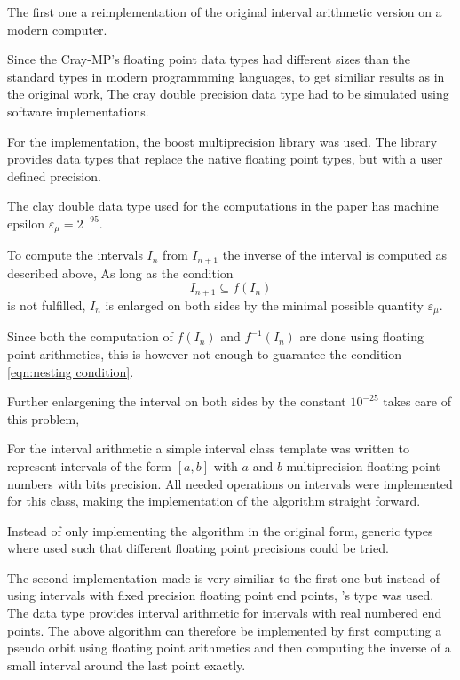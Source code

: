   The first one a reimplementation of the original interval arithmetic version
  on a modern computer.
  
  Since the Cray-MP's floating point data types had different sizes than the
  standard types in modern programmming languages, to get similiar results as
  in the original work,  The cray double precision data type had to be
  simulated using software implementations.
  
  For the \cc implementation, the boost multiprecision library \cite{boostmultiprecision} was used. 
  The library provides data types that replace the native \cc floating point types, but with a user defined precision. 
 
  The clay double data type used for the computations in the paper has machine epsilon
  $\varepsilon_\mu = 2^{-95}$.

  To compute the intervals $I_n$ from $I_{n+1}$ the inverse of the interval is
  computed as described above, 
  As long as the condition 
  \begin{equation}\label{eqn:nesting condition}  
    I_{n+1} \subseteq f(I_n) 
  \end{equation}
  is not fulfilled, $I_n$ is enlarged on both sides by the minimal possible quantity $\varepsilon_\mu$. 

  Since both the computation of $f(I_n)$ and $f^{-1}(I_n)$ are done using
  floating point arithmetics, this is however not enough to guarantee the condition
  \ref{eqn:nesting condition}.
  
  Further enlargening the interval on both sides by the constant $10^{-25}$
  takes care of this problem,
  
  For the interval arithmetic a simple interval class template
   was written to represent
  intervals of the form $[a,b]$ with $a$ and $b$ multiprecision floating point
  numbers with  bits precision. 
  All needed operations on intervals were implemented for this class, making
  the implementation of the algorithm straight forward.

  Instead of only implementing the algorithm in the original form, generic
  types where used such that different floating point precisions could be
  tried.

  The second implementation made is very similiar to the first one but instead
  of using intervals with fixed precision floating point end points, \irram's
   type was used.
  The data type provides interval arithmetic for intervals with real numbered end points. 
  The above algorithm can therefore be implemented by first computing a pseudo
  orbit using floating point arithmetics and then computing the inverse of a
  small interval around the last point exactly.

